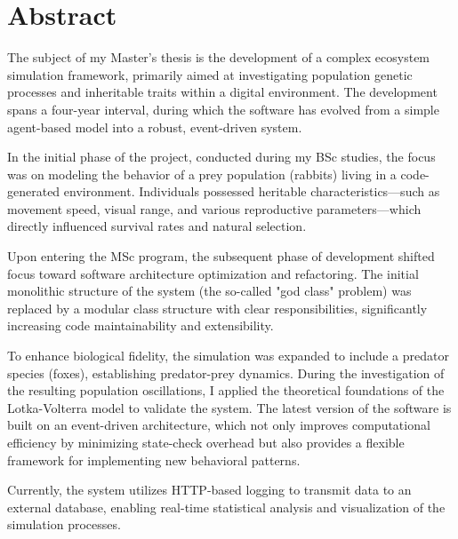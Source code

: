 \vfill
\selectenglish


\chapter*{Abstract}

The subject of my Master's thesis is the development of a complex ecosystem simulation framework, primarily aimed at investigating population genetic processes and inheritable traits within a digital environment. The development spans a four-year interval, during which the software has evolved from a simple agent-based model into a robust, event-driven system.

In the initial phase of the project, conducted during my BSc studies, the focus was on modeling the behavior of a prey population (rabbits) living in a code-generated environment. Individuals possessed heritable characteristics—such as movement speed, visual range, and various reproductive parameters—which directly influenced survival rates and natural selection.

Upon entering the MSc program, the subsequent phase of development shifted focus toward software architecture optimization and refactoring. The initial monolithic structure of the system (the so-called "god class" problem) was replaced by a modular class structure with clear responsibilities, significantly increasing code maintainability and extensibility.

To enhance biological fidelity, the simulation was expanded to include a predator species (foxes), establishing predator-prey dynamics. During the investigation of the resulting population oscillations, I applied the theoretical foundations of the Lotka-Volterra model to validate the system. The latest version of the software is built on an event-driven architecture, which not only improves computational efficiency by minimizing state-check overhead but also provides a flexible framework for implementing new behavioral patterns.

Currently, the system utilizes HTTP-based logging to transmit data to an external database, enabling real-time statistical analysis and visualization of the simulation processes.

\vfill
\selectthesislanguage

\setcounter{romanPage}{\value{page}}
